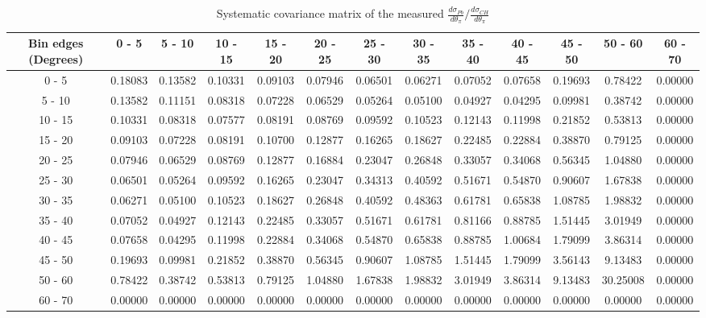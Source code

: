 \documentclass[aps,prl,twocolumn,superscriptaddress,nofootinbib]{revtex4-1}
\begin{document}
\begin{turnpage}
 \begin{table}[h!]
  \centering
  \caption{Systematic covariance matrix of the measured $\frac{d\sigma_{Pb}}{d\theta_{\pi}}/\frac{d\sigma_{CH}}{d\theta_{\pi}}$}
    \begin{tabular}{c||cccccccccccc}
      Bin edges (Degrees) & 0 - 5 & 5 - 10 & 10 - 15 & 15 - 20 & 20 - 25 & 25 - 30 & 30 - 35 & 35 - 40 & 40 - 45 & 45 - 50 & 50 - 60 & 60 - 70 \\
\hline \hline
        0 - 5 &  0.18083 &  0.13582 &  0.10331 &  0.09103 &  0.07946 &  0.06501 &  0.06271 &  0.07052 &  0.07658 &  0.19693 &  0.78422 &  0.00000 \\
       5 - 10 &  0.13582 &  0.11151 &  0.08318 &  0.07228 &  0.06529 &  0.05264 &  0.05100 &  0.04927 &  0.04295 &  0.09981 &  0.38742 &  0.00000 \\
      10 - 15 &  0.10331 &  0.08318 &  0.07577 &  0.08191 &  0.08769 &  0.09592 &  0.10523 &  0.12143 &  0.11998 &  0.21852 &  0.53813 &  0.00000 \\
      15 - 20 &  0.09103 &  0.07228 &  0.08191 &  0.10700 &  0.12877 &  0.16265 &  0.18627 &  0.22485 &  0.22884 &  0.38870 &  0.79125 &  0.00000 \\
      20 - 25 &  0.07946 &  0.06529 &  0.08769 &  0.12877 &  0.16884 &  0.23047 &  0.26848 &  0.33057 &  0.34068 &  0.56345 &  1.04880 &  0.00000 \\
      25 - 30 &  0.06501 &  0.05264 &  0.09592 &  0.16265 &  0.23047 &  0.34313 &  0.40592 &  0.51671 &  0.54870 &  0.90607 &  1.67838 &  0.00000 \\
      30 - 35 &  0.06271 &  0.05100 &  0.10523 &  0.18627 &  0.26848 &  0.40592 &  0.48363 &  0.61781 &  0.65838 &  1.08785 &  1.98832 &  0.00000 \\
      35 - 40 &  0.07052 &  0.04927 &  0.12143 &  0.22485 &  0.33057 &  0.51671 &  0.61781 &  0.81166 &  0.88785 &  1.51445 &  3.01949 &  0.00000 \\
      40 - 45 &  0.07658 &  0.04295 &  0.11998 &  0.22884 &  0.34068 &  0.54870 &  0.65838 &  0.88785 &  1.00684 &  1.79099 &  3.86314 &  0.00000 \\
      45 - 50 &  0.19693 &  0.09981 &  0.21852 &  0.38870 &  0.56345 &  0.90607 &  1.08785 &  1.51445 &  1.79099 &  3.56143 &  9.13483 &  0.00000 \\
      50 - 60 &  0.78422 &  0.38742 &  0.53813 &  0.79125 &  1.04880 &  1.67838 &  1.98832 &  3.01949 &  3.86314 &  9.13483 & 30.25008 &  0.00000 \\
      60 - 70 &  0.00000 &  0.00000 &  0.00000 &  0.00000 &  0.00000 &  0.00000 &  0.00000 &  0.00000 &  0.00000 &  0.00000 &  0.00000 &  0.00000 \\
    \end{tabular}
  \label{tablecov:Pb_Systematic_ThetaPi}
  \end{table}
\end{turnpage}
\end{document}
